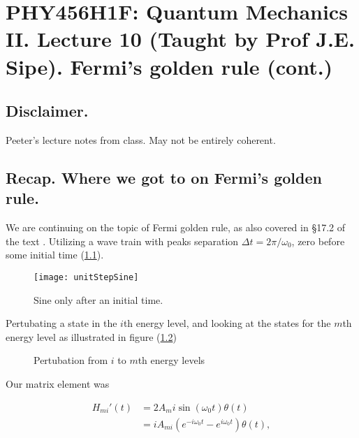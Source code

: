
%

\chapter{PHY456H1F: Quantum Mechanics II.  Lecture 10 (Taught by Prof J.E. Sipe).  Fermi's golden rule (cont.)}
\label{chap:qmTwoL10}
{}
\date{Oct 10, 2011}

\beginArtWithToc

\section{Disclaimer.}

Peeter's lecture notes from class.  May not be entirely coherent.

\section{Recap. Where we got to on Fermi's golden rule.}

We are continuing on the topic of Fermi golden rule, as also covered in \S 17.2 of the text \cite{desai2009quantum}.  Utilizing a wave train with peaks separation $\Delta t = 2\pi/\omega_0$, zero before some initial time (\ref{fig:qmTwoL10:unitStepSine}).

\begin{figure}[htp]
   \centering
   \texttt{[image: unitStepSine]}
   \caption{Sine only after an initial time.}\label{fig:qmTwoL10:unitStepSine}
\end{figure}

Pertubating a state in the $i$th energy level, and looking at the states for the $m$th energy level as illustrated in figure (\ref{fig:qmTwoL10:2})

\begin{figure}[htp]
   \centering
   \def\svgwidth{0.3\columnwidth}
   
   \caption{Pertubation from $i$ to $m$th energy levels}\label{fig:qmTwoL10:2}
\end{figure}

Our matrix element was

\begin{equation}\label{eqn:qmTwoL10:10}
\begin{aligned}
H_{mi}'(t) 
&= 2 A_mi \sin(\omega_0 t) \theta(t) \\
&= i A_{mi} ( e^{-i \omega_0 t} - e^{i \omega_0 t} ) \theta(t),
\end{aligned}
\end{equation}

